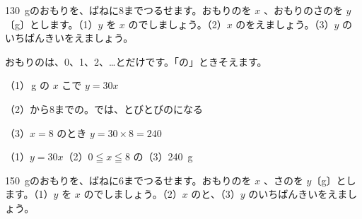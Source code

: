 \begin{reidai}[\R{整数}{せい|すう}しかとらない\R{変域}{へん|いき}]
1\qty{30}{g}のおもりを、ばねに8までつるせます。おもりのを $x$ 、おもりのさのを $y$〔g〕とします。（1）$y$ を $x$ のでしましょう。（2）$x$ のをえましょう。（3）$y$ のいちばんきいをえましょう。\par
\kangaekata おもりのは、0、1、2、…とだけです。「の」ときそえます。\par
\shiki（1）\,g の $x$ こで $y=30x$\par
\hspace*{2.6\zw}（2）から8までの。では、とびとびのになる\par
\begin{bkcenter}
\end{bkcenter}
\hspace*{2.6\zw}（3）\nobreak $x=8$ のとき $y=30\times8=240$\par
\kotae（1）\nobreak $y=30x$\quad（2）\nobreak $0\leqq x\leqq8$ の\quad（3）\nobreak \qty{240}{g}
\end{reidai}

\begin{jibun}
1\qty{50}{g}のおもりを、ばねに6までつるせます。おもりのを $x$ 、さのを $y$〔g〕とします。（1）$y$ を $x$ のでしましょう。（2）$x$ のと、（3）$y$ のいちばんきいをえましょう。
\end{jibun}

